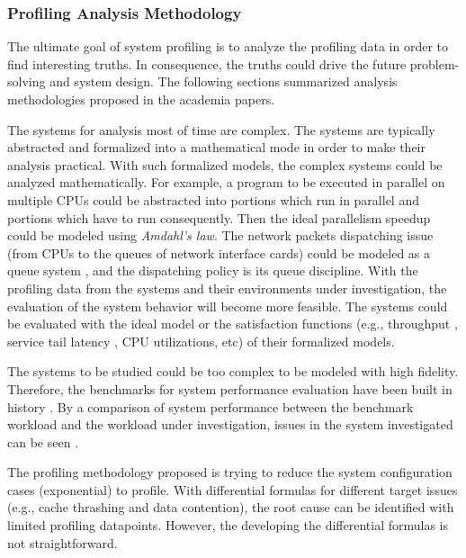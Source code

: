 \subsubsection{Profiling Analysis Methodology}
The ultimate goal of system profiling is to analyze the profiling data in order to find interesting truths. In consequence, the truths could drive the future problem-solving and system design.
The following sections summarized analysis methodologies proposed in the academia papers.

The systems for analysis most of time are complex. The systems are typically abstracted and formalized into a mathematical mode in order to make their analysis practical.
With such formalized models, the complex systems could be analyzed mathematically. For example, a program to be executed in parallel on multiple CPUs could be abstracted into portions which run in parallel and portions which have to run consequently. Then the ideal parallelism speedup could be modeled using \textit{Amdahl's law}.
The network packets dispatching issue (from CPUs to the queues of network interface cards) could be modeled as a queue system \autocite{HillLieb01, DBLP:conf/usenix/HedayatiSSM19}, and the dispatching policy is its queue discipline.
With the profiling data from the systems and their environments under investigation, the evaluation of the system behavior will become more feasible. The systems could be evaluated with the ideal model \autocite{DBLP:journals/cacm/CardwellCGYJ17,DBLP:books/MKP/Larry2011} or the satisfaction functions (e.g., throughput , service tail latency \autocite{DBLP:conf/nsdi/OusterhoutFBBB19, DBLP:conf/sosp/HumphriesNCWRDR21}, CPU utilizations\autocite{DBLP:journals/micro/KanevDHRMWB16, DBLP:conf/asplos/FerdmanAKVAJKPAF12}, etc) of their formalized models\autocite{HillLieb01}.

The systems to be studied could be too complex to be modeled with high fidelity. Therefore, the benchmarks for system performance evaluation have been built in history \autocite{url/spec-benchmarks, url/database-tpc-benchmarks}.
By a comparison of system performance between the benchmark workload and the workload under investigation, issues in the system investigated can be seen \autocite{DBLP:journals/micro/KanevDHRMWB16AZ}.

The profiling methodology proposed \autocite{DBLP:journals/spe/McKenney99} is trying to reduce the system configuration cases (exponential) to profile. With differential formulas for different target issues (e.g., cache thrashing and data contention), the root cause can be identified with limited profiling datapoints. However, the developing the differential formulas is not straightforward.
